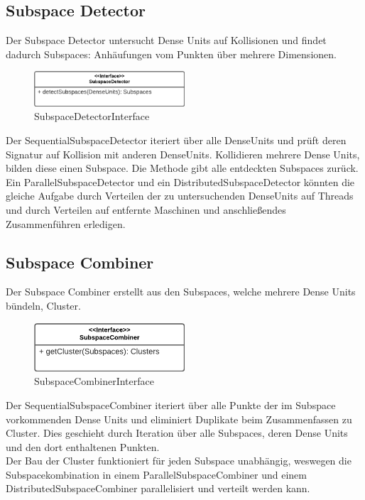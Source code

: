 \subsection{Subspace Detector}
Der Subspace Detector untersucht Dense Units auf Kollisionen und findet dadurch Subspaces: Anhäufungen vom Punkten über
mehrere Dimensionen.
\begin{figure}[h]
	\centering
	\includegraphics[width=0.5\textwidth]{./Bilder/Restrukturierung/SubspaceDetector.png}
	\caption{SubspaceDetectorInterface}
\end{figure}
Der SequentialSubspaceDetector iteriert über alle DenseUnits und prüft deren Signatur auf Kollision mit anderen
DenseUnits. Kollidieren mehrere Dense Units, bilden diese einen Subspace. Die Methode gibt alle entdeckten Subspaces
zurück.\\
Ein ParallelSubspaceDetector und ein DistributedSubspaceDetector könnten die gleiche Aufgabe durch Verteilen der zu
untersuchenden DenseUnits auf Threads und durch Verteilen auf entfernte Maschinen und anschließendes Zusammenführen
erledigen.

\subsection{Subspace Combiner}
Der Subspace Combiner erstellt aus den Subspaces, welche mehrere Dense Units bündeln, Cluster.
\begin{figure}[h]
	\centering
	\includegraphics[width=0.5\textwidth]{./Bilder/Restrukturierung/SubspaceCombiner.png}
	\caption{SubspaceCombinerInterface}
\end{figure}
Der SequentialSubspaceCombiner iteriert über alle Punkte der im Subspace vorkommenden Dense Units und eliminiert
Duplikate beim Zusammenfassen zu Cluster. Dies geschieht durch Iteration über alle Subspaces, deren Dense Units und den
dort enthaltenen Punkten.\\
Der Bau der Cluster funktioniert für jeden Subspace unabhängig, weswegen die Subspacekombination in einem
ParallelSubspaceCombiner und einem DistributedSubspaceCombiner parallelisiert und verteilt werden kann.

